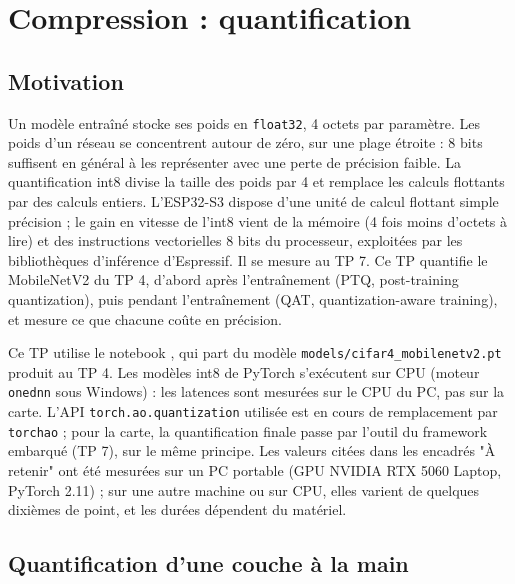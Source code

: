 
\chapter{Compression : quantification}

\section*{Motivation}

Un modèle entraîné stocke ses poids en \texttt{float32}, 4 octets par paramètre. Les poids d'un réseau se concentrent autour de zéro, sur une plage étroite : 8 bits suffisent en général à les représenter avec une perte de précision faible. La quantification int8 divise la taille des poids par 4 et remplace les calculs flottants par des calculs entiers. L'ESP32-S3 dispose d'une unité de calcul flottant simple précision ; le gain en vitesse de l'int8 vient de la mémoire (4 fois moins d'octets à lire) et des instructions vectorielles 8 bits du processeur, exploitées par les bibliothèques d'inférence d'Espressif. Il se mesure au TP 7. Ce TP quantifie le MobileNetV2 du TP 4, d'abord après l'entraînement (PTQ, post-training quantization), puis pendant l'entraînement (QAT, quantization-aware training), et mesure ce que chacune coûte en précision. \\

\begin{imp}
Ce TP utilise le notebook , qui part du modèle \texttt{models/cifar4\_mobilenetv2.pt} produit au TP 4. Les modèles int8 de PyTorch s'exécutent sur CPU (moteur \texttt{onednn} sous Windows) : les latences sont mesurées sur le CPU du PC, pas sur la carte. L'API \texttt{torch.ao.quantization} utilisée est en cours de remplacement par \texttt{torchao} ; pour la carte, la quantification finale passe par l'outil du framework embarqué (TP 7), sur le même principe.
Les valeurs citées dans les encadrés "À retenir" ont été mesurées sur un PC portable (GPU NVIDIA RTX 5060 Laptop, PyTorch 2.11) ; sur une autre machine ou sur CPU, elles varient de quelques dixièmes de point, et les durées dépendent du matériel.
\end{imp}

\section{Quantification d'une couche à la main}

